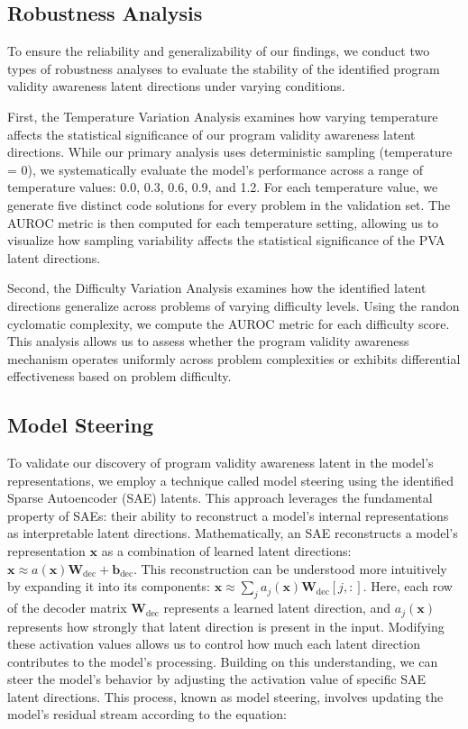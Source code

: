 \subsection{Robustness Analysis}

To ensure the reliability and generalizability of our findings, we conduct two types of robustness analyses to evaluate the stability of the identified program validity awareness latent directions under varying conditions.

First, the Temperature Variation Analysis examines how varying temperature affects the statistical significance of our program validity awareness latent directions. While our primary analysis uses deterministic sampling (temperature = 0), we systematically evaluate the model's performance across a range of temperature values: 0.0, 0.3, 0.6, 0.9, and 1.2. For each temperature value, we generate five distinct code solutions for every problem in the validation set. The AUROC metric is then computed for each temperature setting, allowing us to visualize how sampling variability affects the statistical significance of the PVA latent directions.

Second, the Difficulty Variation Analysis examines how the identified latent directions generalize across problems of varying difficulty levels. Using the randon cyclomatic complexity, we compute the AUROC metric for each difficulty score. This analysis allows us to assess whether the program validity awareness mechanism operates uniformly across problem complexities or exhibits differential effectiveness based on problem difficulty.

\subsection{Model Steering}

To validate our discovery of program validity awareness latent in the model's representations, we employ a technique called model steering using the identified Sparse Autoencoder (SAE) latents. This approach leverages the fundamental property of SAEs: their ability to reconstruct a model's internal representations as interpretable latent directions. Mathematically, an SAE reconstructs a model's representation $\mathbf{x}$ as a combination of learned latent directions: $\mathbf{x} \approx a(\mathbf{x})\mathbf{W}_{\text{dec}} + \mathbf{b}_{\text{dec}}$.
This reconstruction can be understood more intuitively by expanding it into its components: $\mathbf{x} \approx \sum_j a_j(\mathbf{x})\mathbf{W}_{\text{dec}}[j,:]$. Here, each row of the decoder matrix $\mathbf{W}_{\text{dec}}$ represents a learned latent direction, and $a_j(\mathbf{x})$ represents how strongly that latent direction is present in the input. Modifying these activation values allows us to control how much each latent direction contributes to the model's processing.
Building on this understanding, we can steer the model's behavior by adjusting the activation value of specific SAE latent directions. This process, known as model steering, involves updating the model's residual stream according to the equation:

